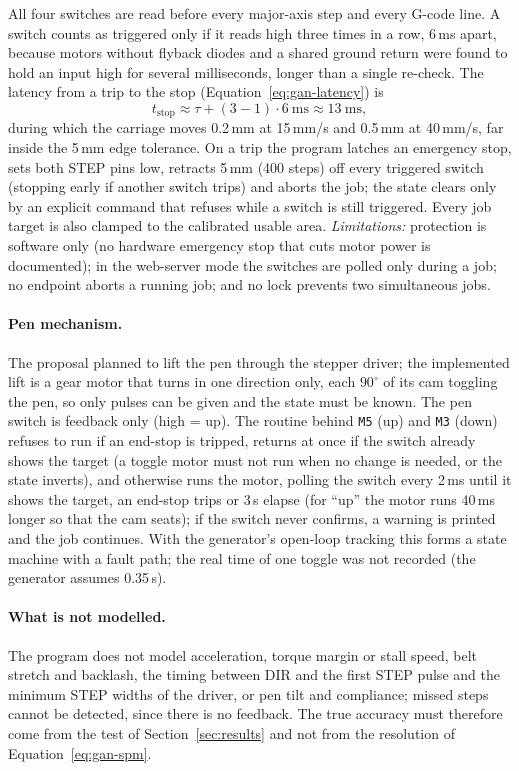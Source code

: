All four switches are read before every major-axis step and every G-code line.
A switch counts as triggered only if it reads high three times in a row, 6\,ms apart, because motors without flyback diodes and a shared ground return were found to hold an input high for several milliseconds, longer than a single re-check.
The latency from a trip to the stop (Equation~\ref{eq:gan-latency}) is
\begin{equation}
t_{\mathrm{stop}}\approx\tau+(3-1)\cdot6\ \mathrm{ms}\approx13\ \mathrm{ms},
\label{eq:gan-latency}
\end{equation}
during which the carriage moves 0.2\,mm at 15\,mm/s and 0.5\,mm at 40\,mm/s, far inside the 5\,mm edge tolerance.
On a trip the program latches an emergency stop, sets both STEP pins low, retracts 5\,mm (400 steps) off every triggered switch (stopping early if another switch trips) and aborts the job; the state clears only by an explicit command that refuses while a switch is still triggered.
Every job target is also clamped to the calibrated usable area.
\emph{Limitations:} protection is software only (no hardware emergency stop that cuts motor power is documented); in the web-server mode the switches are polled only during a job; no endpoint aborts a running job; and no lock prevents two simultaneous jobs.

\paragraph{Pen mechanism.}
\label{sec:gan-pen}
The proposal planned to lift the pen through the stepper driver; the implemented lift is a gear motor that turns in one direction only, each $90^\circ$ of its cam toggling the pen, so only pulses can be given and the state must be known.
The pen switch is feedback only (high = up).
The routine behind \texttt{M5} (up) and \texttt{M3} (down) refuses to run if an end-stop is tripped, returns at once if the switch already shows the target (a toggle motor must not run when no change is needed, or the state inverts), and otherwise runs the motor, polling the switch every 2\,ms until it shows the target, an end-stop trips or 3\,s elapse (for ``up'' the motor runs 40\,ms longer so that the cam seats); if the switch never confirms, a warning is printed and the job continues.
With the generator's open-loop tracking this forms a state machine with a fault path; the real time of one toggle was not recorded (the generator assumes 0.35\,s).

\paragraph{What is not modelled.}
The program does not model acceleration, torque margin or stall speed, belt stretch and backlash, the timing between DIR and the first STEP pulse and the minimum STEP widths of the driver, or pen tilt and compliance; missed steps cannot be detected, since there is no feedback.
The true accuracy must therefore come from the test of Section~\ref{sec:results} and not from the resolution of Equation~\ref{eq:gan-spm}.
